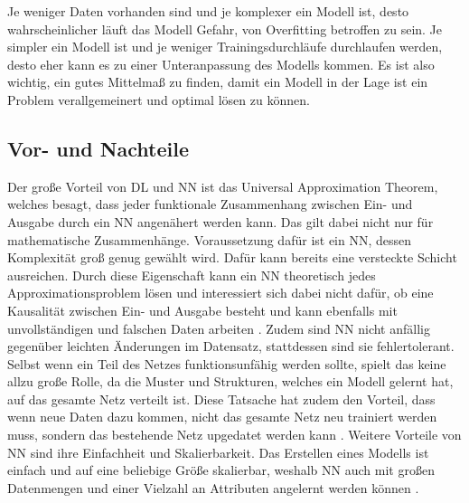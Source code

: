 Je weniger Daten vorhanden sind und je komplexer ein Modell ist, desto wahrscheinlicher läuft das Modell Gefahr, von Overfitting betroffen zu sein. Je simpler ein Modell ist und je weniger
Trainingsdurchläufe durchlaufen werden, desto eher kann es zu einer Unteranpassung des Modells kommen. Es ist also wichtig, ein gutes Mittelmaß zu finden, damit ein Modell in der Lage ist
ein Problem verallgemeinert und optimal lösen zu können.

\subsection{Vor- und Nachteile}
Der große Vorteil von \ac{DL} und \ac{NN} ist das \glqq Universal Approximation Theorem\grqq{}, welches besagt, dass jeder funktionale Zusammenhang zwischen Ein- und Ausgabe
durch ein \ac{NN} angenähert werden kann. Das gilt dabei nicht nur für mathematische Zusammenhänge. Voraussetzung dafür ist ein \ac{NN}, dessen Komplexität groß genug gewählt wird. 
Dafür kann bereits eine versteckte Schicht ausreichen. Durch diese Eigenschaft kann ein \ac{NN} theoretisch jedes Approximationsproblem lösen und interessiert sich dabei nicht dafür, 
ob eine Kausalität zwischen Ein- und Ausgabe besteht und kann ebenfalls mit unvollständigen und falschen Daten arbeiten \cite[vgl. S.74ff.]{NN}. Zudem sind \ac{NN} nicht anfällig 
gegenüber leichten Änderungen im Datensatz, stattdessen sind sie fehlertolerant. Selbst wenn ein Teil des Netzes funktionsunfähig werden sollte, spielt das keine allzu große Rolle,
da die Muster und Strukturen, welches ein Modell gelernt hat, auf das gesamte Netz verteilt ist. Diese Tatsache hat zudem den Vorteil, dass wenn neue Daten dazu kommen, nicht 
das gesamte Netz neu trainiert werden muss, sondern das bestehende Netz upgedatet werden kann \cite[vgl. S.82]{NN}. Weitere Vorteile von \ac{NN} sind ihre Einfachheit und Skalierbarkeit.
Das Erstellen eines Modells ist einfach und auf eine beliebige Größe skalierbar, weshalb \ac{NN} auch mit großen Datenmengen und einer Vielzahl an Attributen angelernt werden 
können \cite[vgl. S.47]{DL_PY}.

